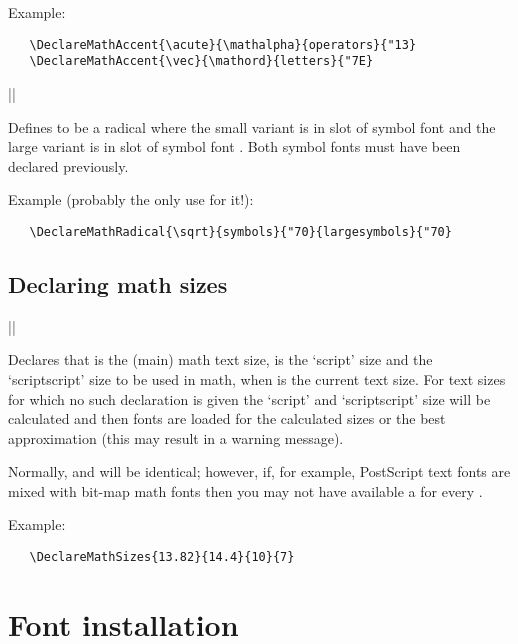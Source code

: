 \documentclass{ltxguide}[1995/11/28]
\begin{document}
Example:
\begin{verbatim}
   \DeclareMathAccent{\acute}{\mathalpha}{operators}{"13}
   \DeclareMathAccent{\vec}{\mathord}{letters}{"7E}
\end{verbatim}


\begin{decl}
  |\DeclareMathRadical| 
                         \\
            \null\hfill {} 
\end{decl}

Defines  to be a radical where the small variant is in slot
 of symbol font  and the large variant is in
slot  of symbol font .  Both symbol fonts must
have been declared previously.

Example (probably the only use for it!):
\begin{verbatim}
   \DeclareMathRadical{\sqrt}{symbols}{"70}{largesymbols}{"70}
\end{verbatim}

\subsection{Declaring math sizes}

\begin{decl}
  |\DeclareMathSizes|   
\end{decl}

Declares that  is the (main) math text size,  is
the `script' size and  the `scriptscript' size to be used in
math, when  is the current text size. For text sizes for which
no such declaration is given the `script' and `scriptscript' size will
be calculated and then fonts are loaded for the calculated sizes or the
best approximation (this may result in a warning message).

Normally,  and  will be identical; however, if, for
example, PostScript text fonts are mixed with bit-map math fonts then
you may not have available a  for every .

Example:
\begin{verbatim}
   \DeclareMathSizes{13.82}{14.4}{10}{7}
\end{verbatim}

\section{Font installation}
\label{Sec:install}
\end{document}
